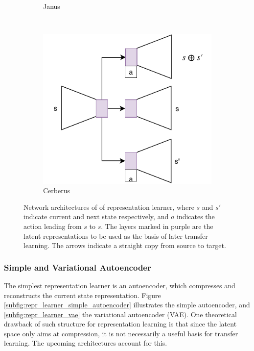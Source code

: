 \begin{figure}[ht!]
\begin{subfigure}{0.5\columnwidth}
		\caption{Janus}
		\label{subfig:repr_learner_janus}
	\end{subfigure}%
	~ 
	\begin{subfigure}{0.5\columnwidth}
		\centering
		\includegraphics[width=\linewidth]{img/cerberus.pdf}
		\caption{Cerberus}
		\label{subfig:repr_learner_cerberus}
	\end{subfigure}
	\caption{Network architectures of of representation learner, where $s$ and $s'$ indicate current and next state respectively, and $a$ indicates the action leading from $s$ to $s$. 
	The layers marked in purple are the latent representations to be used as the basis of later transfer learning. 
	The arrows indicate a straight copy from source to target.
	}
	\label{fig:repr_learner}
\end{figure}

\subsubsection{Simple and Variational Autoencoder}
The simplest representation learner is an autoencoder, which compresses and reconstructs the current state representation. 
Figure \ref{subfig:repr_learner_simple_autoencoder} illustrates the simple autoencoder, and \ref{subfig:repr_learner_vae} the variational autoencoder (VAE). 
One theoretical drawback of such structure for representation learning is that
since the latent space only aims at compression, it is not necessarily a useful basis for transfer learning.
The upcoming architectures account for this.

